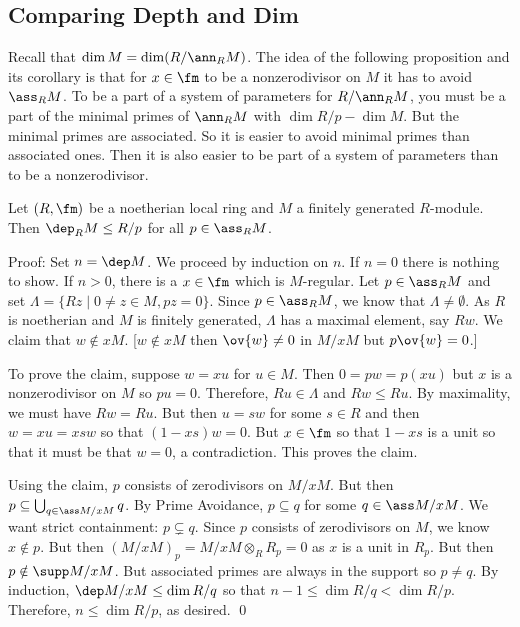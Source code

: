 \subsection{Comparing Depth and Dim}

Recall that $\dim M=\dim(R/\ann_R M)$. The idea of the following proposition and its corollary is that for $x \in \fm$ to be a nonzerodivisor on $M$ it has to avoid $\ass_R M$. To be a part of a system of parameters for $R/\ann_R M$, you must be a part of the minimal primes of $\ann_R M$ with $\dim R/p-\dim M$. But the minimal primes are associated. So it is easier to avoid minimal primes than associated ones. Then it is also easier to be part of a system of parameters than to be a nonzerodivisor. 

\begin{prop}
Let $(R,\fm)$ be a noetherian local ring and $M$ a finitely generated $R$-module. Then $\dep_R M\leq R/p$ for all $p \in \ass_R M$. 
\end{prop}

\noindent Proof: Set $n=\dep M$. We proceed by induction on $n$. If $n=0$ there is nothing to show. If $n>0$, there is a $x \in \fm$ which is $M$-regular. Let $p \in \ass_R M$ and set $\Lambda=\{Rz\;|\; 0 \neq z \in M, pz=0\}$. Since $p \in \ass_R M$, we know that $\Lambda \neq \emptyset$. As $R$ is noetherian and $M$ is finitely generated, $\Lambda$ has a maximal element, say $Rw$. We claim that $w \notin xM$. [$w \notin xM$ then $\ov{w} \neq 0$ in $M/xM$ but $p \ov{w}=0$.] 

To prove the claim, suppose $w=xu$ for $u \in M$. Then $0=pw=p(xu)$ but $x$ is a nonzerodivisor on $M$ so $pu=0$. Therefore, $Ru \in \Lambda$ and $Rw \leq Ru$. By maximality, we must have $Rw=Ru$. But then $u=sw$ for some $s \in R$ and then $w=xu=xsw$ so that $(1-xs)w=0$. But $x \in \fm$ so that $1-xs$ is a unit so that it must be that $w=0$, a contradiction. This proves the claim.

Using the claim, $p$ consists of zerodivisors on $M/xM$. But then $p \subseteq \bigcup_{q \in \ass M/xM} q$. By Prime Avoidance, $p \subseteq q$ for some $q \in \ass M/xM$. We want strict containment: $p \subsetneq q$. Since $p$ consists of zerodivisors on $M$, we know $x \notin p$. But then $(M/xM)_p=M/xM \otimes_R R_p=0$ as $x$ is a unit in $R_p$. But then $p \notin \supp M/xM$. But associated primes are always in the support so $p \neq q$. By induction, $\dep M/xM \leq \dim R/q$ so that $n-1 \leq \dim R/q < \dim R/p$. Therefore, $n \leq \dim R/p$, as desired. \qed \\

